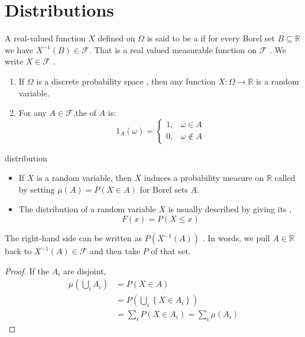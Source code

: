 \documentclass[../main.tex]{subfiles}
\begin{document}
\section{Distributions}

\begin{definition}{}{}
    A real-valued function \(  X  \) defined on \(   \Omega   \) is said to be a  if for every Borel set \(  B\subseteq \mathbb{R}   \) we have \(  X ^{-1} \left( B \right) \in \mathcal{F}   \). That is  a  real valued measurable  function on \(  \mathcal{F}  \) .  We write \(  X \in \mathcal{F}  \) .  
\end{definition}
\begin{example}{}{}
 \begin{enumerate}
    \item If \(   \Omega    \) is a discrete probability space , then any function \(  X: \Omega \to \mathbb{R}   \) is a random variable.   
    \item For any \(  A\in \mathcal{F}  \),the  of  \(  A  \) is:  \[
    1 _{A}\left(  \omega  \right)= \begin{cases} 1,&  \omega \in A\\ 
     0,& \omega \not\in A \end{cases}  
    \]
 \end{enumerate}
 
\end{example}

\begin{definition}{distribution}{}
    \begin{itemize}
        \item If \(  X  \) is a random variable, then \(  X  \) induces a probability measure on \(  \mathbb{R}   \) called  by setting \(  \mu \left( A \right)= P\left( X \in A \right)    \) for Borel sets \(  A  \).   
        \item The distribution of a random variable \(  X  \) is usually described by giving its , \[
        F\left( x \right)= P\left( X\le x \right)  
        \] 
    \end{itemize}
       
\end{definition}
\begin{remark}
    The right-hand side can be written as \(  P\left( X ^{-1} \left( A \right)  \right)   \) . In words, we pull \(  A\in \mathbb{R}   \) back to \(  X^{-1} \left( A \right) \in \mathcal{F}   \) and then take \(  P  \) of that set.    
\end{remark}
\begin{proof}
    If the \(  A_{i}  \) are disjoint, \[
    \begin{aligned}
    \mu \left( \bigcup _{i}A_{i} \right)  &=  P\left( X \in A \right) \\ 
     &= P\left( \bigcup _{i}\left\{ X \in A_{i} \right\} \right)\\ 
      &= \sum _{i} P\left( X \in A_{i} \right)= \sum _{i}\mu \left( A_{i} \right)   
    \end{aligned}
    \] 
\end{proof}
\end{document}
